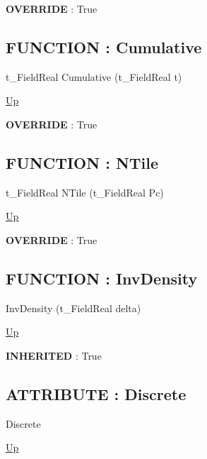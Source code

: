\par
\par
\textbf{OVERRIDE} : True \\
\subsection*{FUNCTION : Cumulative}
\hypertarget{ecldoc:linearregression.ols.distributionbase.cumulative}{}
\begin{minipage}[t]{\textwidth}
\begin{flushleft}
t\_FieldReal Cumulative (t\_FieldReal t)
\end{flushleft}
\end{minipage}
\hyperlink{ecldoc:linearregression.ols.fdistribution}{Up}

\par
\par
\textbf{OVERRIDE} : True \\
\subsection*{FUNCTION : NTile}
\hypertarget{ecldoc:linearregression.ols.distributionbase.ntile}{}
\begin{minipage}[t]{\textwidth}
\begin{flushleft}
t\_FieldReal NTile (t\_FieldReal Pc)
\end{flushleft}
\end{minipage}
\hyperlink{ecldoc:linearregression.ols.fdistribution}{Up}

\par
\par
\textbf{OVERRIDE} : True \\
\subsection*{FUNCTION : InvDensity}
\hypertarget{ecldoc:linearregression.ols.distributionbase.invdensity}{}
\begin{minipage}[t]{\textwidth}
\begin{flushleft}
 InvDensity (t\_FieldReal delta)
\end{flushleft}
\end{minipage}
\hyperlink{ecldoc:linearregression.ols.fdistribution}{Up}

\par
\par
\textbf{INHERITED} : True \\
\subsection*{ATTRIBUTE : Discrete}
\hypertarget{ecldoc:linearregression.ols.distributionbase.discrete}{}
\begin{minipage}[t]{\textwidth}
\begin{flushleft}
 Discrete 
\end{flushleft}
\end{minipage}
\hyperlink{ecldoc:linearregression.ols.fdistribution}{Up}

